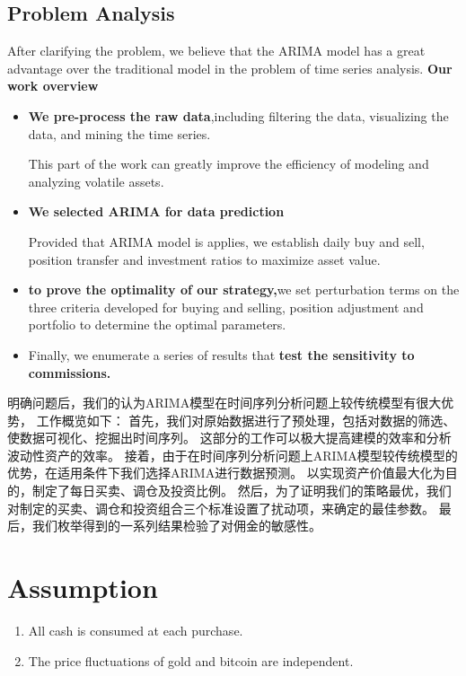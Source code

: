 \documentclass{mcmthesis}
\begin{document}
\subsection{Problem Analysis}
After clarifying the problem, we believe that the ARIMA model has a great advantage over the traditional model in the problem of time series analysis.
\textbf{Our work overview}
\begin{itemize}    %
  \item \textbf{We pre-process the raw data},including filtering the data, visualizing the data, and mining the time series.
  
  This part of the work can greatly improve the efficiency of modeling and analyzing volatile assets.
  \item \textbf{We selected ARIMA for data prediction}
  
  Provided that ARIMA model is applies, we establish daily buy and sell, position transfer and investment ratios to maximize asset value.
  \item \textbf{to prove the optimality of our strategy,}we set perturbation terms on the three criteria developed for buying and selling, position adjustment and portfolio to determine the optimal parameters.
  \item Finally, we enumerate a series of results that \textbf{test the sensitivity to commissions.}
\end{itemize}
明确问题后，我们的认为ARIMA模型在时间序列分析问题上较传统模型有很大优势，
工作概览如下：
首先，我们对原始数据进行了预处理，包括对数据的筛选、使数据可视化、挖掘出时间序列。
这部分的工作可以极大提高建模的效率和分析波动性资产的效率。
接着，由于在时间序列分析问题上ARIMA模型较传统模型的优势，在适用条件下我们选择ARIMA进行数据预测。
以实现资产价值最大化为目的，制定了每日买卖、调仓及投资比例。
然后，为了证明我们的策略最优，我们对制定的买卖、调仓和投资组合三个标准设置了扰动项，来确定的最佳参数。
最后，我们枚举得到的一系列结果检验了对佣金的敏感性。


\section{Assumption}
\begin{enumerate}    %
  \item All cash is consumed at each purchase.

  \item The price fluctuations of gold and bitcoin are independent.
\end{enumerate}
\end{document}
